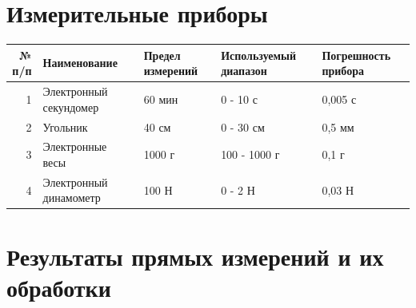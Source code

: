 \documentclass[a4paper,14pt]{article}
\begin{document}
\section{Измерительные приборы}

\begin{tabular}{|r|p{12em}|p{10em}|p{7.5em}|p{6.5em}|}
	\hline		{№ п/п } & Наименование  & Предел измерений & Используемый диапазон & Погрешность прибора \\
	\hline		1 	  & Электронный секундомер & 60 мин & 0 - 10 с & 0,005 с \\
	\hline		2     & Угольник & 40 см & 0 - 30 см & 0,5 мм \\
	\hline		3     & Электронные весы & 1000 г & 100 - 1000 г &  0,1 г \\
	\hline		4     & Электронный динамометр & 100 Н & 0 - 2 Н & 0,03 Н \\
	\hline
\end{tabular}%

\section{Результаты прямых измерений и их обработки}
\end{document}
